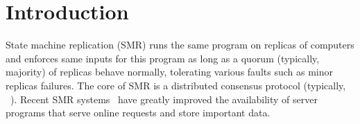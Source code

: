 \section{Introduction} \label{sec:intro}


State machine replication (SMR) runs the same program on replicas of 
computers and enforces same inputs for this program as long as a quorum 
(typically, majority) of replicas behave normally, tolerating various 
faults such as minor replicas failures. The core of SMR is 
a distributed consensus protocol 
(typically, \paxos~\cite{paxos}). 
Recent SMR 
systems~\cite{eve:osdi12,rex:eurosys14,crane:sosp15} have greatly 
improved the availability of server programs that serve online requests and 
store important data.










